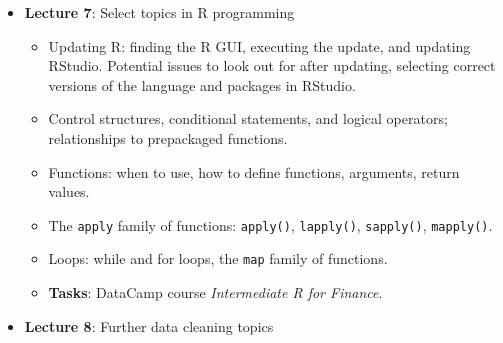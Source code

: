 \documentclass[
  letterpaper,
  DIV=11,
  numbers=noendperiod]{scrartcl}
\providecommand{\tightlist}{%
  \setlength{\itemsep}{0pt}\setlength{\parskip}{0pt}}\usepackage{longtable,booktabs,array}
\begin{document}
\begin{itemize}
  \begin{itemize}
  \tightlist
  \item
    The concept of reproducible research.
  \item
    Introduction to R Markdown: the R Markdown document, YAML header,
    code chunks.
  \item
    Knitting documents: HTML, PDF, Word, and slides.
  \item
    Customizing R Markdown documents: themes, templates, and CSS.
  \item
    Quarto: the next generation of R Markdown.
  \item
    Math formulas: incorporating LaTeX into R Markdown.
  \item
    Time-permitting: \texttt{.Rnw} files and Knitr/Sweave.
  \item
    \textbf{Tasks}: DataCamp course \emph{Reporting with R Markdown}.
    Making sure you have \LaTeX ~installed in your computer, or TinyTeX
    as a package in R\footnote{TinyTeX is a lightweight, portable,
      cross-platform, and easy-to-maintain LaTeX distribution. It is
      available as a package in R, and can be installed with
      \texttt{tinytex::install\_tinytex()}}.
  \end{itemize}
\item
  \textbf{Lecture 7}: Select topics in R programming

  \begin{itemize}
  \tightlist
  \item
    Updating R: finding the R GUI, executing the update, and updating
    RStudio. Potential issues to look out for after updating, selecting
    correct versions of the language and packages in RStudio.
  \item
    Control structures, conditional statements, and logical operators;
    relationships to prepackaged functions.
  \item
    Functions: when to use, how to define functions, arguments, return
    values.
  \item
    The \texttt{apply} family of functions: \texttt{apply()},
    \texttt{lapply()}, \texttt{sapply()}, \texttt{mapply()}.
  \item
    Loops: while and for loops, the \texttt{map} family of functions.
  \item
    \textbf{Tasks}: DataCamp course \emph{Intermediate R for Finance}.
  \end{itemize}
\item
  \textbf{Lecture 8}: Further data cleaning topics


\end{itemize}
\end{document}
